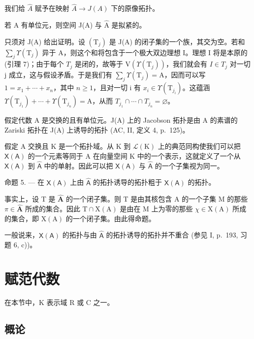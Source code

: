 我们给 \(\hat{A}\) 赋予在映射 \(\hat{A} \rightarrow J(A)\) 下的原像拓扑。

若 A 有单位元，则空间 J(A) 与 \(\hat{\mathrm{A}}\) 是拟紧的。

只须对 J(A) 给出证明。设 \((\mathrm{T}_{j})\) 是 J(A) 的闭子集的一个族，其交为空。若和 \(\sum_{j}\Upsilon(\mathrm{T}_{j})\) 异于 A，则这个和将包含于一个极大双边理想 I。理想 I 将是本原的 (引理 7)；由于每个 \(T_{j}\) 是闭的，故等于 \(\mathrm{V}(\Upsilon(\mathrm{T}_{j}))\)，我们就会有 \(I\in T_{j}\) 对一切 j 成立，这与假设矛盾。于是我们有 \(\sum_{j}\Upsilon(\mathrm{T}_{j})=\mathrm{A}\)，因而可以写 \(1=x_{1}+\cdots+x_{n}\)，其中 \(n\geqslant1\)，且对一切 i 有 \(x_{i}\in\Upsilon(\mathrm{T}_{j_{i}})\)。这蕴涵 \(\Upsilon(\mathrm{T}_{j_{1}})+\cdots+\Upsilon(\mathrm{T}_{j_{n}})=\mathrm{A}\)，从而 \(T_{j_{1}}\cap\cdots\cap T_{j_{n}}=\varnothing\)。

假定代数 A 是交换的且有单位元。J(A) 上的 Jacobson 拓扑是由 A 的素谱的 Zariski 拓扑在 J(A) 上诱导的拓扑 (AC, II, 定义 4, p.~125)。

假定 A 交换且 K 是一个拓扑域。从 K 到 \(\mathcal{L}(\mathrm{K})\) 上的典范同构使我们可以把 \(\mathsf{X}(\mathsf{A})\) 的一个元素等同于 A 在向量空间 K 中的一个表示，这就定义了一个从 \(\mathsf{X}(\mathsf{A})\) 到 \(\widehat{\mathsf{A}}\) 中的单射。因此可以把 \(\mathsf{X}(\mathsf{A})\) 与 \(\widehat{\mathsf{A}}\) 的一个子集视为同一。

命题 5. — 在 \(\mathsf{X}(\mathsf{A})\) 上由 \(\widehat{\mathsf{A}}\) 的拓扑诱导的拓扑粗于 \(\mathsf{X}(\mathsf{A})\) 的拓扑。

事实上，设 T 是 \(\widehat{\mathbf{A}}\) 的一个闭子集。则 T 是由其核包含 A 的一个子集 M 的那些 \(\pi \in \widehat{\mathbf{A}}\) 所成的集合。因此 \(\mathrm{T} \cap \mathrm{X}(\mathrm{A})\) 是由在 M 上为零的那些 \(\chi \in \mathrm{X}(\mathrm{A})\) 所成的集合，即 \(\mathrm{X}(\mathrm{A})\) 的一个闭子集。由此得命题。

一般说来，\(\mathsf{X}(\mathsf{A})\) 的拓扑与由 \(\widehat{\mathsf{A}}\) 的拓扑诱导的拓扑并不重合 (参见 I, p.~193, 习题 6, c))。

\section{赋范代数}

在本节中，K 表示域 R 或 C 之一。

\subsection{概论}

